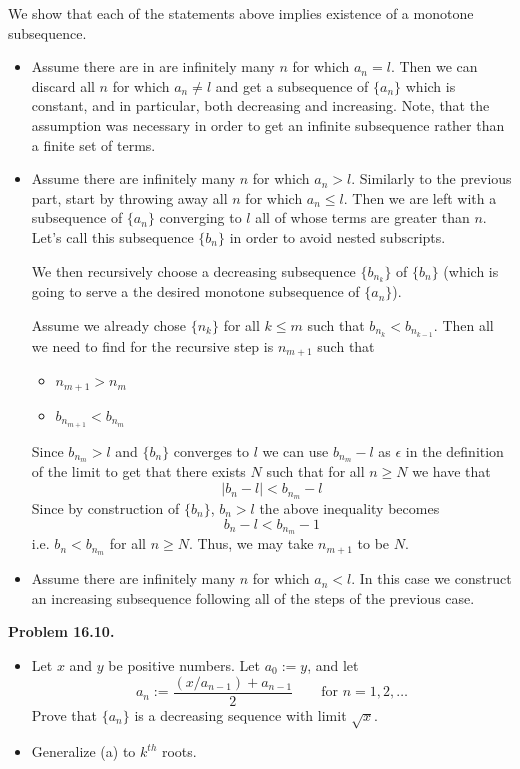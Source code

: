 \documentclass[12pt]{article}
\def\black{\color{black}}
\def\green{\color{rltgreen}}
\newcommand\bi{\begin{itemize}}
\newcommand\ei{\end{itemize}}
\newcommand\itema{\item[(a)]}
\newcommand\itemb{\item[(b)]}
\renewcommand\|{\ | \ }
\def\pb#1{{\green \bf Problem #1.}\hskip 8pt \black}
\def\sequence#1{$\{{#1}_n\}$}
\def\subsequence#1{$\{{#1}_{n_k}\}$}
\newcommand\e\epsilon
\begin{document}
We show that each of the statements above implies existence of a monotone
subsequence.

\bi
\item
Assume there are in are infinitely many $n$ for which $a_n = l$. Then
we can discard all $n$ for which $a_n \neq l$ and get a subsequence
of \sequence a which is constant, and in particular, both decreasing 
and increasing. Note, that the assumption was necessary in order to get
an infinite subsequence rather than a finite set of terms.
\item
Assume there are infinitely many $n$ for which $a_n > l$. Similarly to the
previous part, start by throwing away all $n$ for which $a_n \leq l$. Then
we are left with a subsequence of \sequence a converging to $l$ all of whose
terms are greater than $n$. Let's call this subsequence \sequence b in
order to avoid nested subscripts.

We then recursively choose a decreasing subsequence
\subsequence b of \sequence b (which is going to serve a the desired
monotone subsequence of \sequence a).

Assume we already chose $\{n_k\}$ for all $k \leq m$ such that
$b_{n_k} < b_{n_{k - 1}}$. Then all we 
need to find for the recursive step is $n_{m + 1}$ such that
\bi
\item
$n_{m + 1} > n_m$
\item
$b_{n_{m + 1}} < b_{n_m}$
\ei

Since $b_{n_m} > l$ and \sequence b converges to $l$ we can use 
$b_{n_m} - l$ as $\e$ in the definition of the limit to get that
there exists $N$ such that for all $n \geq N$ we have that
\[
|b_n - l| < b_{n_m} - l
\]
Since by construction of \sequence b, $b_n > l$ the above inequality becomes
\[
b_n - l < b_{n_m} - 1
\]
i.e. $b_n < b_{n_m}$ for all $n \geq N$. Thus, we may take 
$n_{m + 1}$ to be $N$.
\item
Assume there are infinitely many $n$ for which $a_n < l$. In this case
we construct an increasing subsequence following all of the steps of the
previous case.
\ei

\vskip 12pt

\pb {16.10}

\bi
\itema
Let $x$ and $y$ be positive numbers. Let $a_0 := y$, and let
\[
a_n := \frac {(x / a_{n - 1}) + a_{n - 1}} 2 
	\qquad \text{for } n = 1, 2, \ldots
\]
Prove that \sequence a is a decreasing sequence with limit $\sqrt x$.
\itemb
Generalize (a) to $k^{th}$ roots.
\ei
\end{document}
